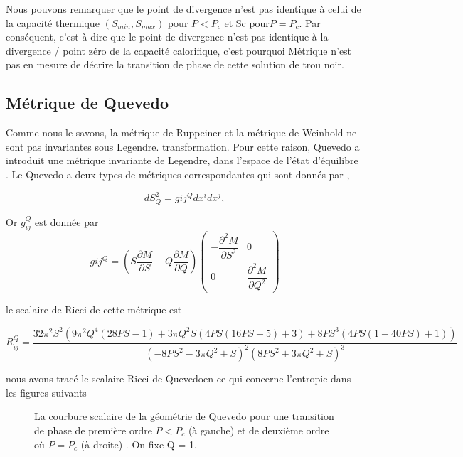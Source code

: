 Nous pouvons remarquer que le point de divergence n’est pas identique à celui de la
capacité thermique $(S_{min}, S_{max})$ pour $P < P_{c}$ et Sc pour$ P = P_{c}$. Par conséquent,
c'est à dire 
que le point de divergence n'est pas identique à la divergence / point zéro de la capacité calorifique, c'est pourquoi
Métrique n'est pas en mesure de décrire la transition de phase de cette solution de trou noir.
\subsection{Métrique de Quevedo}
Comme nous le savons, la métrique de Ruppeiner et la métrique de Weinhold ne sont pas invariantes sous Legendre.
transformation. Pour cette raison, Quevedo a introduit une métrique invariante de Legendre,
dans l'espace de l'état d'équilibre \cite{54}. Le Quevedo a deux types de métriques correspondantes
qui sont donnés par \cite{55},

\begin{equation}
dS_{Q}^{2}=g{ij}^{Q}dx^{i}dx^{j},
\end{equation}

Or $g_{ij}^{Q}$ est donnée par 
\begin{equation}
g{ij}^{Q}=\left( S\dfrac{\partial M}{\partial S}+Q\dfrac{\partial M}{\partial Q}\right)
\begin{pmatrix}
 -\dfrac{\partial^{2}M}{\partial S^{2}}  & 0\\
  0                                     & \dfrac{\partial^{2}M}{\partial Q^{2}}                  
\end{pmatrix}
\end{equation}

le scalaire de Ricci de cette métrique est

\begin{equation}
R_{ij}^{Q}=\dfrac{32\pi^{2} S^{2}\left(9\pi^{2}Q^{4}(28PS-1)+3\pi Q^{2}S(4PS(16PS-5)+3)+8PS^{3}(4PS(1-40PS)+1) \right) }{\left(-8PS^{2}-3\pi Q^{2}+S \right)^{2}\left(8PS^{2}+3\pi Q^{2}+S \right)^{3}  }
\end{equation}

nous avons tracé le scalaire  Ricci  de Quevedoen ce qui concerne l'entropie dans les figures suivants \\

\begin{figure}[H]
	\caption{La courbure scalaire de la géométrie de Quevedo pour une transition de phase
		de première ordre $P < P_{c}$ (à gauche) et de deuxième ordre où $P = P_{c}$ (à droite) . On fixe Q = 1.}
\end{figure}

